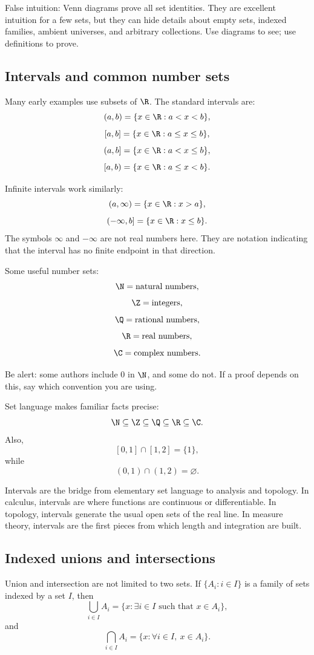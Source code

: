 \begin{trapbox}
False intuition: Venn diagrams prove all set identities. They are excellent intuition for a few sets, but they can hide details about empty sets, indexed families, ambient universes, and arbitrary collections. Use diagrams to see; use definitions to prove.
\end{trapbox}

\subsection{Intervals and common number sets}

Many early examples use subsets of $\R$. The standard intervals are:
\[
(a,b)=\{x\in\R:a<x<b\},
\]
\[
[a,b]=\{x\in\R:a\leq x\leq b\},
\]
\[
(a,b]=\{x\in\R:a<x\leq b\},
\]
\[
[a,b)=\{x\in\R:a\leq x<b\}.
\]

Infinite intervals work similarly:
\[
(a,\infty)=\{x\in\R:x>a\},
\]
\[
(-\infty,b]=\{x\in\R:x\leq b\}.
\]
The symbols $\infty$ and $-\infty$ are not real numbers here. They are notation indicating that the interval has no finite endpoint in that direction.

Some useful number sets:
\[
\N=\text{natural numbers},
\]
\[
\Z=\text{integers},
\]
\[
\Q=\text{rational numbers},
\]
\[
\R=\text{real numbers},
\]
\[
\C=\text{complex numbers}.
\]

Be alert: some authors include $0$ in $\N$, and some do not. If a proof depends on this, say which convention you are using.

Set language makes familiar facts precise:
\[
\N\subseteq\Z\subseteq\Q\subseteq\R\subseteq\C.
\]
Also,
\[
[0,1]\cap[1,2]=\{1\},
\]
while
\[
(0,1)\cap(1,2)=\varnothing.
\]

\begin{historybox}
Intervals are the bridge from elementary set language to analysis and topology. In calculus, intervals are where functions are continuous or differentiable. In topology, intervals generate the usual open sets of the real line. In measure theory, intervals are the first pieces from which length and integration are built.
\end{historybox}

\subsection{Indexed unions and intersections}

Union and intersection are not limited to two sets. If $\{A_i:i\in I\}$ is a family of sets indexed by a set $I$, then
\[
\bigcup_{i\in I}A_i=\{x:\exists i\in I\text{ such that }x\in A_i\},
\]
and
\[
\bigcap_{i\in I}A_i=\{x:\forall i\in I,\ x\in A_i\}.
\]

